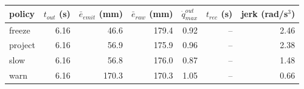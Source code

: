 \begin{tabular}{lrrrrrr}
\toprule
policy & $t_{out}$ (s) & $\bar{e}_{emit}$ (mm) & $\bar{e}_{raw}$ (mm) & $\dot{q}_{max}^{out}$ & $t_{rec}$ (s) & jerk (rad/s$^3$) \\
\midrule
freeze & 6.16 & 46.6 & 179.4 & 0.92 & -- & 2.46 \\
project & 6.16 & 56.9 & 175.9 & 0.96 & -- & 2.38 \\
slow & 6.16 & 56.8 & 176.0 & 0.87 & -- & 1.48 \\
warn & 6.16 & 170.3 & 170.3 & 1.05 & -- & 0.66 \\
\bottomrule
\end{tabular}
